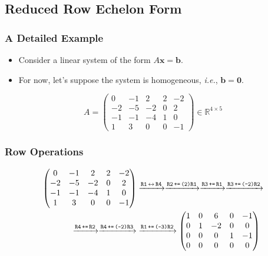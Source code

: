 \documentclass[xcolor=table]{beamer}
\newcommand{\R}{\mathbb{R}}
\newcommand{\vect}[1]{\boldsymbol{#1}}
\newcommand{\lrarr}{\ensuremath{\leftrightarrow}}
\begin{document}
	\subsection{Reduced Row Echelon Form}
	\begin{frame}
		\frametitle{A Detailed Example}
		\begin{itemize}
			\item Consider a linear system of the form $A\vect{x}=\vect{b}$.
			\item For now, let's suppose the system is homogeneous, \emph{i.e.}, $\vect{b}=\vect{0}$.
		\end{itemize}
	
		\begin{equation*}
			A=\begin{pmatrix}
				 0 & -1 &  2 & 2 & -2\\
				-2 & -5 & -2 & 0 &  2\\
				-1 & -1 & -4 & 1 &  0\\
				 1 &  3 &  0 & 0 & -1
			\end{pmatrix}\in\R^{4\times 5}
		\end{equation*}
	\end{frame}
	
	\begin{frame}
		\frametitle{Row Operations}
		\begin{align*}
			\begin{pmatrix}
				 0 & -1 &  2 & 2 & -2\\
				-2 & -5 & -2 & 0 &  2\\
				-1 & -1 & -4 & 1 &  0\\
				 1 &  3 &  0 & 0 & -1
			\end{pmatrix} & \xrightarrow{\texttt{R1\,\lrarr\,R4}}\xrightarrow{\texttt{R2\,+=\,(2)R1}}\xrightarrow{\texttt{R3\,+=\,R1}}\xrightarrow{\texttt{R3\,+=\,(-2)R2}}\\
			\xrightarrow{\texttt{R4\,+=\,R2}}\xrightarrow{\texttt{R4\,+=\,(-2)R3}} & \xrightarrow{\texttt{R1\,+=\,(-3)R2}}\begin{pmatrix}
				1 & 0 &  6 & 0 & -1\\
				0 & 1 & -2 & 0 &  0\\
				0 & 0 &  0 & 1 & -1\\
				0 & 0 &  0 & 0 &  0
			\end{pmatrix}
		\end{align*}
	\end{frame}
	
\end{document}
